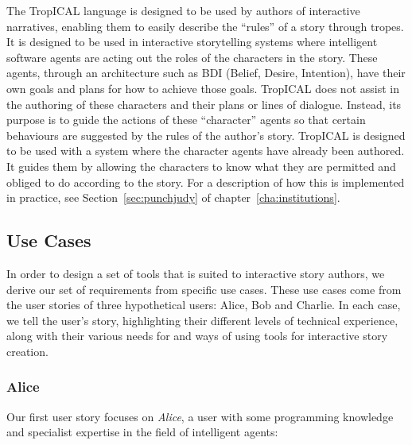 \documentclass[11pt]{report}
\begin{document}
The TropICAL language is designed to be used by authors of interactive
narratives, enabling them to easily describe the ``rules'' of a story through
tropes. It is designed to be used in interactive storytelling systems where
intelligent software agents are acting out the roles of the characters in the
story. These agents, through an architecture such as BDI (Belief, Desire,
Intention), have their own goals and plans for how to achieve those goals.
TropICAL does not assist in the authoring of these characters and their plans or
lines of dialogue. Instead, its purpose is to guide the actions of these
``character'' agents so that certain behaviours are suggested by the rules of the author's
story. TropICAL is designed to be used with a system where the character agents have
already been authored. It guides them by allowing the characters to know what
they are permitted and obliged to do according to the story. For a description of how this is
implemented in practice, see Section~\ref{sec:punchjudy} of
chapter~\ref{cha:institutions}.

\subsection{Use Cases}
\label{sec:use-cases}

In order to design a set of tools that is suited to interactive story authors, we derive our set of requirements from specific use
cases. These use cases come from the user stories of three hypothetical users: Alice, Bob and
Charlie. In each case, we tell the user's story, highlighting their different
levels of technical experience, along with
their various needs for and ways of using tools for
interactive story creation.

\subsubsection{Alice}

Our first user story focuses on \emph{Alice}, a user with some programming knowledge and
specialist expertise in the field of intelligent agents:
\end{document}
